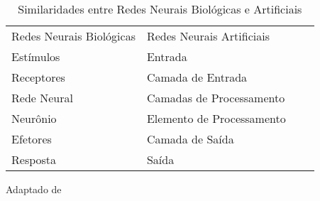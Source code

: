 \begin{table}[htp]
\centering
\caption{Similaridades entre Redes Neurais Biológicas e Artificiais}
\begin{tabular}{llll} 
\cline{1-2}
Redes Neurais Biológicas & Redes Neurais Artificiais &  &   \\ 
\cline{1-2}
Estímulos                & Entrada                   &  &   \\
Receptores               & Camada de Entrada         &  &   \\
Rede Neural              & Camadas de Processamento  &  &   \\
Neurônio                 & Elemento de Processamento &  &   \\
Efetores                 & Camada de Saída           &  &   \\
Resposta                 & Saída~                    &  &   \\
\cline{1-2}
\end{tabular}
\label{Tab: tabela_sem_bio}

Adaptado de \cite{ref_NN_definition}
\end{table}